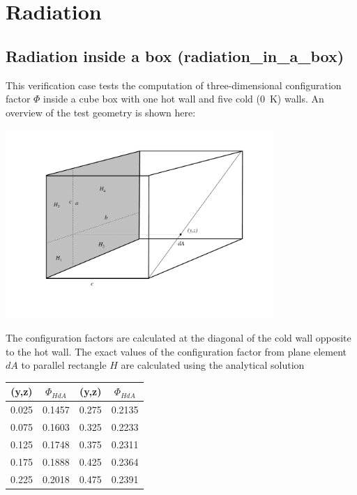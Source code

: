 \documentclass[11pt]{book}
\begin{document}
\clearpage

\section{Radiation}

\subsection{Radiation inside a box ({\bf radiation\_in\_a\_box}) }

This verification case tests the computation of three-dimensional
configuration factor $\Phi$ inside a cube box with one hot wall and
five cold (0~K) walls. An overview of the test geometry is shown here:
\begin{center}
\includegraphics[width=4.0in]{FIGURES/box}
\end{center}
The configuration factors are calculated at the
diagonal of the cold wall opposite to the hot wall. The exact values of the configuration factor
from plane element $dA$ to parallel rectangle $H$
are calculated using the analytical solution~\cite{Siegel:1}

\begin{center}
\begin{tabular}{|c|c|c|c|}
\hline (y,z) & $\Phi_{HdA}$ & (y,z) & $\Phi_{HdA}$ \\ \hline \hline
0.025   &0.1457 & 0.275 &0.2135 \\
0.075   &0.1603 & 0.325 &0.2233 \\
0.125   &0.1748 & 0.375 &0.2311 \\
0.175   &0.1888 & 0.425 &0.2364 \\
0.225   &0.2018 & 0.475 &0.2391 \\ \hline
\end{tabular}
\end{center}
\end{document}
